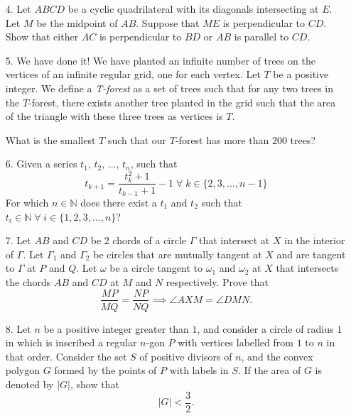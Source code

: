 \documentclass{article}
\begin{document}
\begin{enumerate}
\vspace{6pt}
\item[4.]
Let $ABCD$ be a cyclic quadrilateral with its diagonals intersecting at $E$.
Let $M$ be the midpoint of $AB$.
Suppose that $ME$ is perpendicular to $CD$.
Show that either $AC$ is perpendicular to $BD$ or $AB$ is parallel to $CD$.


\vspace{6pt}
\item[5.] %
We have done it! We have planted an infinite number of trees on the vertices of an infinite regular grid, one for each vertex. Let $T$ be a positive integer. 
We define a \textit{T-forest} as a set of trees such that for any two trees in the $T$-forest, there exists another tree planted in the grid such that the area of the triangle with these three trees as vertices is $T$.

What is the smallest $T$ such that our $T$-forest has more than $200$ trees?


\vspace{6pt}
\item[6.] %
Given a series $t_1$, $t_2$, $\dots$, $t_n$, such that 
$$t_{k + 1} = \frac{t_k^2 + 1}{t_{k - 1} + 1} - 1 \; \forall \; k \in \{2, 3, \dots, n - 1\}$$
For which $n \in \mathbb{N}$ does there exist a $t_1$ and $t_2$ such that $t_i \in \mathbb{N} \; \forall \; i \in \{1, 2, 3, \dots, n \}$?


\vspace{6pt}
\item[7.]
Let $AB$ and $CD$ be 2 chords of a circle $\Gamma$ that intersect at $X$ in the interior of $\Gamma$.
Let $\Gamma_1$ and $\Gamma_2$ be circles that are mutually tangent at $X$ and are tangent to $\Gamma$ at $P$ and $Q$.
Let $\omega$ be a circle tangent to $\omega_1$ and $\omega_2$ at $X$ that intersects the chords $AB$ and $CD$ at $M$ and $N$ respectively.
Prove that 
\[
	\frac{MP}{MQ} =\frac{NP}{NQ} \implies \angle AXM =\angle DMN.
\]

\vspace{6pt}
\item[8.] %
Let $n$ be a positive integer greater than $1$, and consider a circle of radius $1$ in which is inscribed a regular $n$-gon $P$ with vertices labelled from $1$ to $n$ in that order.
Consider the set $S$ of positive divisors of $n$, and the convex polygon $G$ formed by the points of $P$ with labels in $S$.
If the area of $G$ is denoted by $|G|$, show that
\[ 
	|G| < \frac{3}{2}.
\]

\end{enumerate}
\end{document}

